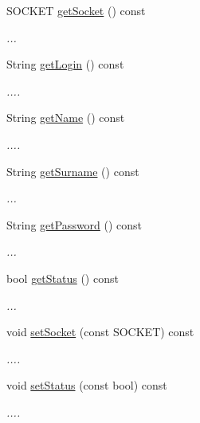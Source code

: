 \begin{DoxyCompactItemize}
S\+O\+C\+K\+ET \hyperlink{classServerUser_aa260c021d44bce338061b2ffe187c260}{get\+Socket} () const 
\begin{DoxyCompactList}\small\item\em ... \end{DoxyCompactList}\item 
String \hyperlink{classServerUser_a4ace9b03d2dcde07b616468608bc1ae0}{get\+Login} () const 
\begin{DoxyCompactList}\small\item\em .... \end{DoxyCompactList}\item 
String \hyperlink{classServerUser_a763e23bc60062a9f216af69cc003a6d8}{get\+Name} () const 
\begin{DoxyCompactList}\small\item\em .... \end{DoxyCompactList}\item 
String \hyperlink{classServerUser_a65791cc9ca96585bde4483fb11d97adb}{get\+Surname} () const 
\begin{DoxyCompactList}\small\item\em ... \end{DoxyCompactList}\item 
String \hyperlink{classServerUser_a46ee509027d923a27e644f4fb891231b}{get\+Password} () const 
\begin{DoxyCompactList}\small\item\em ... \end{DoxyCompactList}\item 
bool \hyperlink{classServerUser_a2ec1eff8b6b0d16b71ac0bae8953af22}{get\+Status} () const 
\begin{DoxyCompactList}\small\item\em ... \end{DoxyCompactList}\item 
void \hyperlink{classServerUser_a50305db89103b56b3205be2e8fd328cc}{set\+Socket} (const S\+O\+C\+K\+ET) const 
\begin{DoxyCompactList}\small\item\em .... \end{DoxyCompactList}\item 
void \hyperlink{classServerUser_a29f0ed0f022e7051aaf429dfe6ce42b3}{set\+Status} (const bool) const 
\begin{DoxyCompactList}\small\item\em .... \end{DoxyCompactList}\item 

\end{DoxyCompactItemize}
